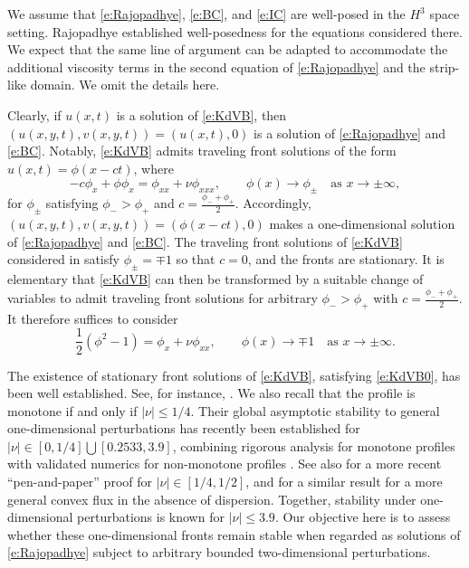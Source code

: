 \documentclass[final,11pt]{article}
\renewcommand{\leq}{\leqslant}
\theoremstyle{definition} %
\theoremstyle{plain}
\theoremstyle{definition} %
\theoremstyle{remark}
\begin{document}
We assume that \eqref{e:Rajopadhye}, \eqref{e:BC}, and \eqref{e:IC} are well-posed in the $H^3$ space setting. Rajopadhye \cite{Raj1996} established well-posedness for the equations considered there. We expect that the same line of argument can be adapted to accommodate the additional viscosity terms in the second equation of \eqref{e:Rajopadhye} and the strip-like domain. We omit the details here. 

Clearly, if $u(x,t)$ is a solution of \eqref{e:KdVB}, then $(u(x,y,t),v(x,y,t)) = (u(x,t),0)$ is a solution of \eqref{e:Rajopadhye} and \eqref{e:BC}. 
Notably, \eqref{e:KdVB} admits traveling front solutions of the form $u(x,t)=\phi(x-ct)$, where 
\[
-c\phi_x+\phi\phi_x=\phi_{xx}+\nu \phi_{xxx}, \qquad \phi(x)\to \phi_\pm \quad\text{as $x\to \pm \infty$},
\]
for $\phi_\pm$ satisfying $\phi_->\phi_+$ and $c=\frac{\phi_- + \phi_+}{2}$. Accordingly, $(u(x,y,t),v(x,y,t)) = (\phi(x-ct),0)$ makes a one-dimensional solution of \eqref{e:Rajopadhye} and \eqref{e:BC}. 
The traveling front solutions of \eqref{e:KdVB} considered in \cite{BARKER2025} satisfy $\phi_\pm=\mp1$ so that $c=0$, and the fronts are stationary. It is elementary that \eqref{e:KdVB} can then be transformed by a suitable change of variables to admit traveling front solutions for arbitrary $\phi_->\phi_+$ with $c=\frac{\phi_- + \phi_+}{2}$. It therefore suffices to consider 
\begin{equation}\label{e:KdVB0}
\frac12(\phi^2-1)=\phi_x+\nu \phi_{xx}, \qquad \phi(x)\to \mp1 \quad\text{as $x\to \pm \infty$}.
\end{equation}

The existence of stationary front solutions of \eqref{e:KdVB}, satisfying \eqref{e:KdVB0}, has been well established. See, for instance, \cite{BS1985}. We also recall that the profile is monotone if and only if $|\nu|\leq 1/4$. Their global asymptotic stability to general one-dimensional perturbations has recently been established for $|\nu| \in [0,1/4]\bigcup [0.2533,3.9]$, combining rigorous analysis for monotone profiles with validated numerics for non-monotone profiles \cite{BARKER2025}. See also \cite{chen2026} for a more recent ``pen-and-paper'' proof for $|\nu|\in[1/4,1/2]$, and \cite{KangVasseur2017} for a similar result for a more general convex flux in the absence of dispersion. Together, stability under one-dimensional perturbations is known for $|\nu|\leq 3.9$. Our objective here is to assess whether these one-dimensional fronts remain stable when regarded as solutions of \eqref{e:Rajopadhye} subject to arbitrary bounded two-dimensional perturbations.
\end{document}
